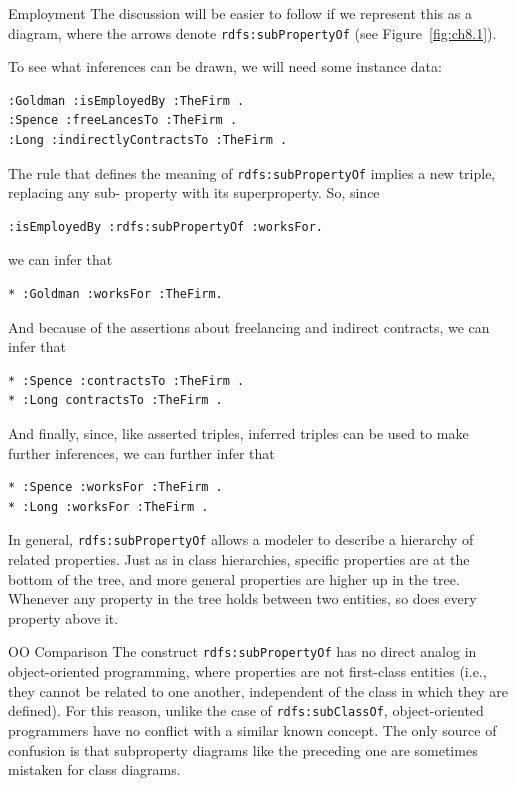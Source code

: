 \begin{example}{Employment}
The discussion will be easier to follow if we represent this as a
diagram, where the arrows denote
\texttt{rdfs:subPropertyOf} (see Figure~\ref{fig:ch8.1}).

To see what inferences can be drawn, we will need some instance data:

\begin{lstlisting}
:Goldman :isEmployedBy :TheFirm .
:Spence :freeLancesTo :TheFirm .
:Long :indirectlyContractsTo :TheFirm .
\end{lstlisting}

The rule that defines the meaning of \texttt{rdfs:subPropertyOf} implies a new
triple, replacing any sub- property with its superproperty. So, since

\begin{lstlisting}
:isEmployedBy :rdfs:subPropertyOf :worksFor.
\end{lstlisting}

we can infer that

\begin{lstlisting}
* :Goldman :worksFor :TheFirm.
\end{lstlisting}

And because of the assertions about freelancing and indirect contracts,
we can infer that

\begin{lstlisting}
* :Spence :contractsTo :TheFirm .
* :Long contractsTo :TheFirm .
\end{lstlisting}

And finally, since, like asserted triples, inferred triples can be used
to make further inferences, we can further infer that

\begin{lstlisting}
* :Spence :worksFor :TheFirm .
* :Long :worksFor :TheFirm .
\end{lstlisting}

In general, \texttt{rdfs:subPropertyOf} allows a modeler to describe a hierarchy
of related properties. Just as in class hierarchies, specific properties
are at the bottom of the tree, and more general properties are higher up
in the tree. Whenever any property in the tree holds between two
entities, so does every property above it.
\end{example}

\begin{sidebar}{OO Comparison}
The construct \texttt{rdfs:subPropertyOf} has no direct analog in object-oriented
programming, where properties are not first-class entities (i.e., they
cannot be related to one another, independent of the class in which they
are defined). For this reason, unlike the case of \texttt{rdfs:subClassOf},
object-oriented programmers have no conflict with a similar known
concept. The only source of confusion is that subproperty diagrams like
the preceding one are sometimes mistaken for class diagrams.
\end{sidebar}

